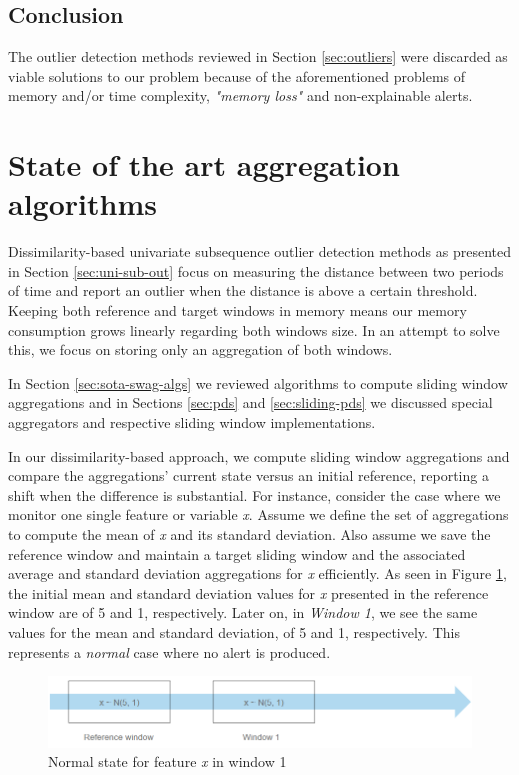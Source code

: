 \subsection*{Conclusion}
The outlier detection methods reviewed in Section \ref{sec:outliers} were discarded as viable solutions to our problem because of the aforementioned problems of memory and/or time complexity, \textit{"memory loss"} and non-explainable alerts.

\section{State of the art aggregation algorithms}
Dissimilarity-based univariate subsequence outlier detection methods as presented in Section \ref{sec:uni-sub-out} focus on measuring the distance between two periods of time and report an outlier when the distance is above a certain threshold. Keeping both reference and target windows in memory means our memory consumption grows linearly regarding both windows size. In an attempt to solve this, we focus on storing only an aggregation of both windows. 

In Section \ref{sec:sota-swag-algs} we reviewed algorithms to compute sliding window aggregations and in Sections \ref{sec:pds} and \ref{sec:sliding-pds} we discussed special aggregators and respective sliding window implementations. 

In our dissimilarity-based approach, we compute sliding window aggregations and compare the aggregations’ current state versus an initial reference, reporting a shift when the difference is substantial. For instance, consider the case where we monitor one single feature or variable \textit{x}. Assume we define the set of aggregations to compute the mean of \textit{x} and its standard deviation. Also assume we save the reference window and maintain a target sliding window and the associated average and standard deviation aggregations for \textit{x} efficiently. As seen in Figure \ref{fig:approach2-initial-state}, the initial mean and standard deviation values for \textit{x} presented in the reference window are of 5 and 1, respectively. Later on, in \textit{Window 1}, we see the same values for the mean and standard deviation, of 5 and 1, respectively. This represents a \textit{normal} case where no alert is produced.

\begin{figure}[!htb]
    \begin{center}
      \includegraphics[scale=0.65]{figures/approach2-normality.png}
      \caption[]{Normal state for feature \textit{x} in window 1}
      \label{fig:approach2-initial-state}
    \end{center}
\end{figure}


